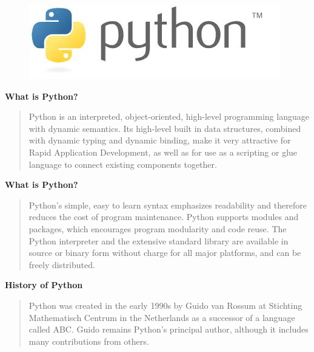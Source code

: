 \documentclass{beamer}
\begin{document}
	\begin{frame}
		\begin{figure}
\centering
\includegraphics[width=1.1\linewidth]{pythonlogo}

\end{figure}

	\end{frame}
	\begin{frame}
	\Large
	\textbf{What is Python?}
	\begin{quote}
		Python is an interpreted, object-oriented, high-level programming language with dynamic semantics. Its high-level built in data structures, combined with dynamic typing and dynamic binding, make it very attractive for Rapid Application Development, as well as for use as a scripting or glue language to connect existing components together. 
	\end{quote}
	\end{frame}

	\begin{frame}
		\Large
			\textbf{What is Python?}
		\begin{quote}
			Python's simple, easy to learn syntax emphasizes readability and therefore reduces the cost of program maintenance. Python supports modules and packages, which encourages program modularity and code reuse. The Python interpreter and the extensive standard library are available in source or binary form without charge for all major platforms, and can be freely distributed.
		\end{quote}
	\end{frame}
	
\begin{frame}
		\Large
		\textbf{History of Python}
		\begin{quote}
	Python was created in the early 1990s by Guido van Rossum at Stichting Mathematisch Centrum in the Netherlands as a successor of a language called ABC. Guido remains Python’s principal author, although it includes many contributions from others.
	\end{quote}
\end{frame}
\end{document}
